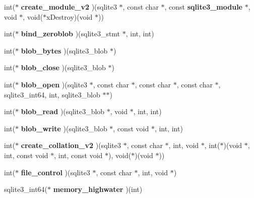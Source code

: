 \begin{CompactItemize}
\item 
int($\ast$ \textbf{create\_\-module\_\-v2} )(sqlite3 $\ast$, const char $\ast$, const {\bf sqlite3\_\-module} $\ast$, void $\ast$, void($\ast$xDestroy)(void $\ast$))\label{structsqlite3__api__routines_db23aa0a0e87e87a49fd966bd76074c6}

\item 
int($\ast$ \textbf{bind\_\-zeroblob} )(sqlite3\_\-stmt $\ast$, int, int)\label{structsqlite3__api__routines_ef29af08d96132a9c1614e71d3fd5565}

\item 
int($\ast$ \textbf{blob\_\-bytes} )(sqlite3\_\-blob $\ast$)\label{structsqlite3__api__routines_fec8ae98efedcf23cf4c905c4d19a827}

\item 
int($\ast$ \textbf{blob\_\-close} )(sqlite3\_\-blob $\ast$)\label{structsqlite3__api__routines_de93370fd15e0448e6772f7b78a84fc6}

\item 
int($\ast$ \textbf{blob\_\-open} )(sqlite3 $\ast$, const char $\ast$, const char $\ast$, const char $\ast$, sqlite3\_\-int64, int, sqlite3\_\-blob $\ast$$\ast$)\label{structsqlite3__api__routines_18a0c32756c791c5a73bb4c45ee7ce50}

\item 
int($\ast$ \textbf{blob\_\-read} )(sqlite3\_\-blob $\ast$, void $\ast$, int, int)\label{structsqlite3__api__routines_29cc9b9b5b2c27b811b9a88fb58baafb}

\item 
int($\ast$ \textbf{blob\_\-write} )(sqlite3\_\-blob $\ast$, const void $\ast$, int, int)\label{structsqlite3__api__routines_3e901af06611d2fb2b5149f46ec860bc}

\item 
int($\ast$ \textbf{create\_\-collation\_\-v2} )(sqlite3 $\ast$, const char $\ast$, int, void $\ast$, int($\ast$)(void $\ast$, int, const void $\ast$, int, const void $\ast$), void($\ast$)(void $\ast$))\label{structsqlite3__api__routines_a3e459de0245e62a8dec024afd2826a8}

\item 
int($\ast$ \textbf{file\_\-control} )(sqlite3 $\ast$, const char $\ast$, int, void $\ast$)\label{structsqlite3__api__routines_b03f5516b9f04024b8530a083d9f646a}

\item 
sqlite3\_\-int64($\ast$ \textbf{memory\_\-highwater} )(int)\label{structsqlite3__api__routines_7512654c388986f791506d2ae1f6d90c}


\end{CompactItemize}
